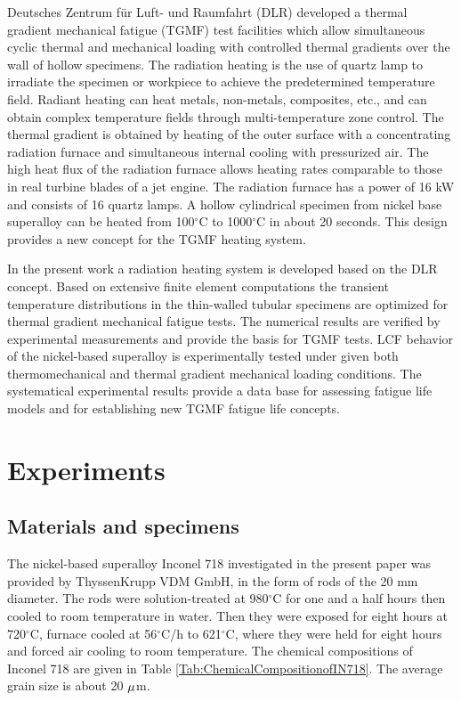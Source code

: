 \documentclass[preprint,5p,twocolumn,10pt,sort&compress]{elsarticle}
\begin{document}
Deutsches Zentrum f\"{u}r Luft- und Raumfahrt (DLR) \cite{BAUFELD2008219}  developed a thermal gradient mechanical fatigue (TGMF) test facilities which allow simultaneous cyclic thermal and mechanical loading with controlled thermal gradients over the wall of hollow specimens. 
The radiation heating is the use of quartz lamp to irradiate the specimen or workpiece to achieve the predetermined temperature field. Radiant heating can heat metals, non-metals, composites, etc., and can obtain complex temperature fields through multi-temperature zone control.
The thermal gradient is obtained by heating of the outer surface with a concentrating radiation furnace and simultaneous internal cooling with pressurized air. The high heat flux of the radiation furnace allows heating rates comparable to those in real turbine blades of a jet engine. The radiation furnace has a power of 16 kW and consists of 16 quartz lamps. A hollow cylindrical specimen from nickel base superalloy can be heated from 100$^\circ$C to 1000$^\circ$C in about 20 seconds. This design provides a new concept for the TGMF heating system.  

In the present work a radiation heating system is developed based on the DLR concept. Based on extensive finite element computations the transient temperature distributions in the thin-walled tubular specimens are optimized for thermal gradient mechanical fatigue tests. The numerical results are verified by experimental measurements and provide the basis for TGMF tests. LCF behavior of the nickel-based superalloy is experimentally tested under given both thermomechanical and thermal gradient mechanical loading conditions. The systematical experimental results provide a data base for assessing fatigue life models and for establishing new TGMF fatigue life concepts. 



\section{Experiments}

\subsection{Materials and specimens}
The nickel-based superalloy Inconel 718 investigated in the present paper was provided by ThyssenKrupp VDM GmbH, in the form of rods of the 20 mm diameter.
The rods were solution-treated at 980$^{\circ}$C for one and a half hours then cooled to room temperature in water.
Then they were exposed for eight hours at 720$^{\circ}$C, furnace cooled at 56$^{\circ}$C/h to 621$^{\circ}$C, where they were held for eight hours and forced air cooling to room temperature.
The chemical compositions of Inconel 718 are given in Table \ref{Tab:ChemicalCompositionofIN718}.
The average grain size is about 20 $\rm{\mu }$m.
\end{document}
